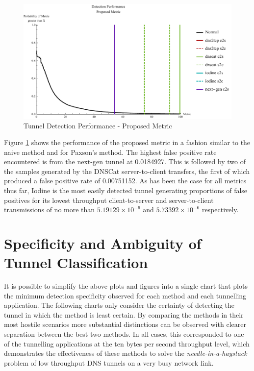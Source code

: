 \documentclass[12pt]{report}
\theoremstyle{remark}
\theoremstyle{definition}
\theoremstyle{definition}
\theoremstyle{definition}
\begin{document}
\begin{figure}
\centering
\includegraphics[width=\textwidth]{figures/mphv-100.pdf}
\caption[Tunnel Detection Performance - Proposed Metric]{Tunnel Detection 
Performance - Proposed Metric}
\label{mphv}
\end{figure}

Figure \ref{mphv} shows the performance of the proposed metric in a fashion
similar to the naive method and for Paxson's method. The highest false positive
rate encountered is from the next-gen tunnel at 0.0184927. This is followed by
two of the samples generated by the DNSCat server-to-client transfers, the first
of which produced a false positive rate of 0.00751152. As has been the case for all
metrics thus far, Iodine is the most easily detected tunnel generating
proportions of false positives for its lowest throughput client-to-server and
server-to-client transmissions of no more than $5.19129\times10^{-6}$ and
$5.73392\times10^{-6}$ respectively.

\section{Specificity and Ambiguity of Tunnel Classification}
\label{detection-perf-cert}

It is possible to simplify the above plots and figures into a single chart that
plots the minimum detection specificity observed for each method and each
tunnelling application. The following charts only consider the certainty of
detecting the tunnel in which the method is least certain. By comparing the
methods in their most hostile scenarios more substantial distinctions can be
observed with clearer separation between the best two methods. In all cases,
this corresponded to one of the tunnelling applications at the ten bytes per
second throughput level, which demonstrates the effectiveness of these methods
to solve the \emph{needle-in-a-haystack} problem of low throughput DNS tunnels
on a very busy network link.
\end{document}
